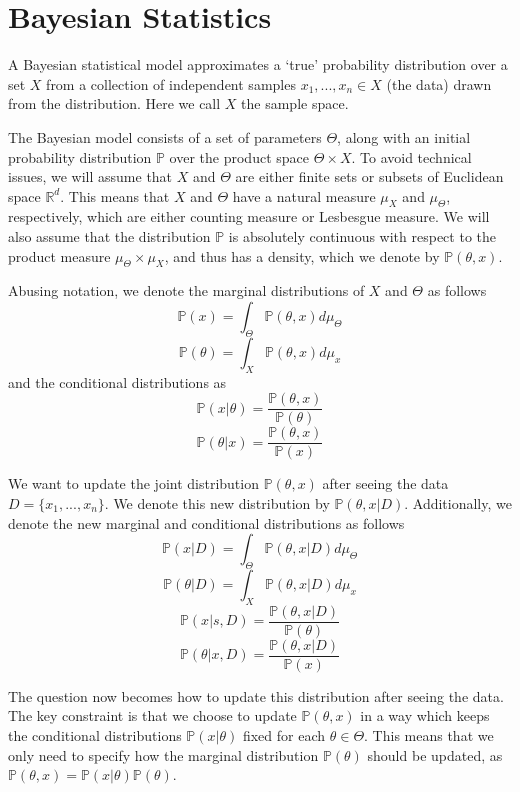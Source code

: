 
\section{Bayesian Statistics}
A Bayesian statistical model approximates a `true' probability distribution over a set $X$
from a collection of independent samples $x_1,...,x_n\in X$ (the data) drawn from the distribution. 
Here we call $X$ the sample space.

The Bayesian model consists of a set of parameters $\Theta$, along with an initial probability distribution $\mathbb{P}$ over 
the product space $\Theta\times X$. To avoid technical issues, we will assume that $X$ and $\Theta$ are either finite
sets or subsets of Euclidean space $\mathbb{R}^d$. This means that $X$ and $\Theta$ have a natural measure
$\mu_X$ and $\mu_\Theta$, respectively, which are either counting measure or Lesbesgue measure.
We will also assume that the distribution $\mathbb{P}$ is absolutely
continuous with respect to the product measure $\mu_\Theta\times \mu_X$, and thus has a density, which we denote by
$\mathbb{P}(\theta,x)$.

Abusing notation, we denote the marginal distributions of $X$ and $\Theta$ as follows
$$\mathbb{P}(x) = \int_{\Theta} \mathbb{P}(\theta,x)d\mu_\Theta$$
$$\mathbb{P}(\theta) = \int_{X} \mathbb{P}(\theta,x)d\mu_x$$
and the conditional distributions as
$$\mathbb{P}(x|\theta) = \frac{\mathbb{P}(\theta,x)}{\mathbb{P}(\theta)}$$
$$\mathbb{P}(\theta|x) = \frac{\mathbb{P}(\theta,x)}{\mathbb{P}(x)}$$

We want to update the joint distribution $\mathbb{P}(\theta,x)$ after seeing the data $D = \{x_1,...,x_n\}$. We denote this
new distribution by $\mathbb{P}(\theta,x|D)$. Additionally, we denote the new marginal and conditional distributions as follows
$$\mathbb{P}(x|D) = \int_{\Theta} \mathbb{P}(\theta,x|D)d\mu_\Theta$$
$$\mathbb{P}(\theta|D) = \int_{X} \mathbb{P}(\theta,x|D)d\mu_x$$
$$\mathbb{P}(x|s,D) = \frac{\mathbb{P}(\theta,x|D)}{\mathbb{P}(\theta)}$$
$$\mathbb{P}(\theta|x,D) = \frac{\mathbb{P}(\theta,x|D)}{\mathbb{P}(x)}$$

The question now becomes how to update this distribution after seeing the data. The key constraint
is that we choose to update $\mathbb{P}(\theta,x)$ in a way which keeps the conditional distributions 
$\mathbb{P}(x|\theta)$ fixed for each $\theta\in \Theta$. This means that we only need to specify how the marginal distribution
$\mathbb{P}(\theta)$ should be updated, as $\mathbb{P}(\theta,x) = \mathbb{P}(x|\theta)\mathbb{P}(\theta)$.

